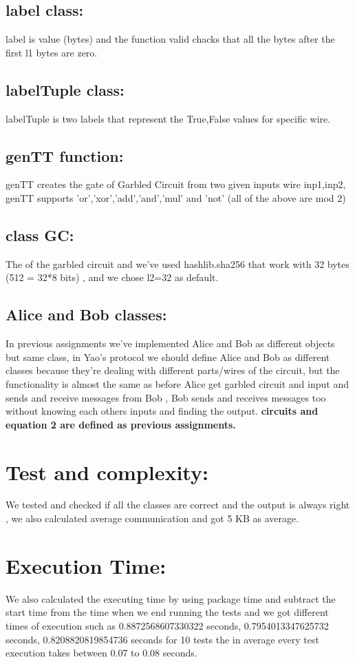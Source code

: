 \documentclass{article}
\begin{document}
\subsection*{label class:} label is value (bytes) and the function valid chacks that all the bytes after the first l1 bytes are zero.
\subsection*{labelTuple class:}
labelTuple is two labels that represent the True,False values for specific wire.
\subsection*{genTT function:} genTT creates the gate of Garbled Circuit from two given inputs wire inp1,inp2, genTT supports 'or','xor','add','and','mul' and 'not'
(all of the above are mod 2)
\subsection*{class GC:} The of the garbled circuit and we've used hashlib.sha256 that work with 32 bytes (512 = 32*8 bits) , and we chose  l2=32 as default.
\subsection*{ Alice and Bob classes:} In previous assignments we've implemented Alice and Bob as different objects but same class, in Yao's protocol we should define Alice and Bob as different classes because they're dealing with different parts/wires of the circuit, but the functionality is almost the same as before Alice get garbled circuit and input and  sends and receive messages from Bob , Bob sends and receives messages too without knowing each others inputs and finding the output.
\textbf{circuits and equation 2 are defined as previous assignments.}
\section*{Test and complexity:}
We tested and checked if all the classes are correct and the output is always right , we also calculated average communication and got 5 KB as average.
\section*{Execution Time:}
We also calculated the executing time by using package time and subtract the start time from the time when we end running the tests and we got different times of execution such as   0.8872568607330322 seconds, 0.7954013347625732  seconds, 0.8208820819854736 seconds for 10 tests the in average every test execution takes between 0.07 to 0.08 seconds.
\end{document}
